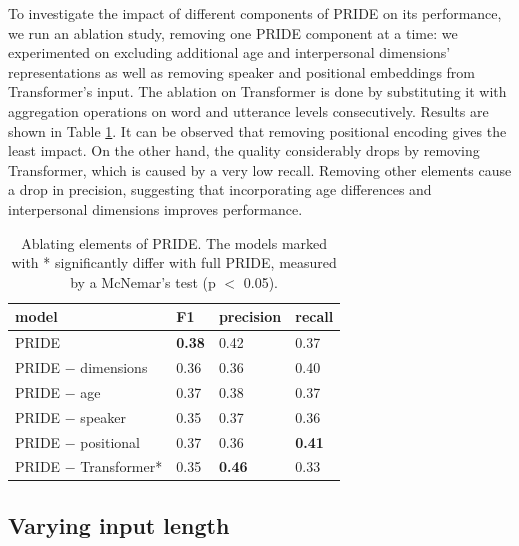 To investigate the impact of different components of PRIDE on its performance,
we run an ablation study, removing one PRIDE component at a time: we experimented on excluding additional age and interpersonal dimensions' representations as well as removing speaker and positional embeddings from Transformer's input.
The ablation on Transformer is done by substituting it with aggregation operations on word and utterance levels consecutively. 
Results are shown in Table \ref{tab:ablation}. 
It can be observed that removing positional encoding gives the least impact. On the other hand, the quality considerably drops by removing Transformer, which is caused by a very low recall. Removing other elements cause a drop in precision, suggesting that incorporating age differences and interpersonal dimensions improves performance.

\begin{table}[t!]
\centering
\begin{adjustbox}{width=0.53\textwidth}
\begin{tabular}{@{}llll@{}}
\textbf{model}           & \textbf{F1}   & \textbf{precision} & \textbf{recall} \\ \toprule
PRIDE               & \textbf{0.38}     & 0.42            & 0.37         \\ \midrule
PRIDE $-$ dimensions  & 0.36     & 0.36            & 0.40          \\
PRIDE $-$ age         & 0.37     & 0.38            & 0.37         \\
PRIDE $-$ speaker     & 0.35     & 0.37            & 0.36         \\
PRIDE $-$ positional  & 0.37     & 0.36            & \textbf{0.41}         \\
PRIDE $-$ Transformer* & 0.35     & \textbf{0.46}            & 0.33        
\end{tabular}
\end{adjustbox}
\caption[Ablating elements of PRIDE.]{Ablating elements of PRIDE. The models marked with * significantly differ with full PRIDE, measured by a McNemar’s test (p $<$ 0.05). 
}
\label{tab:ablation}
\end{table}

\subsection{Varying input length}

